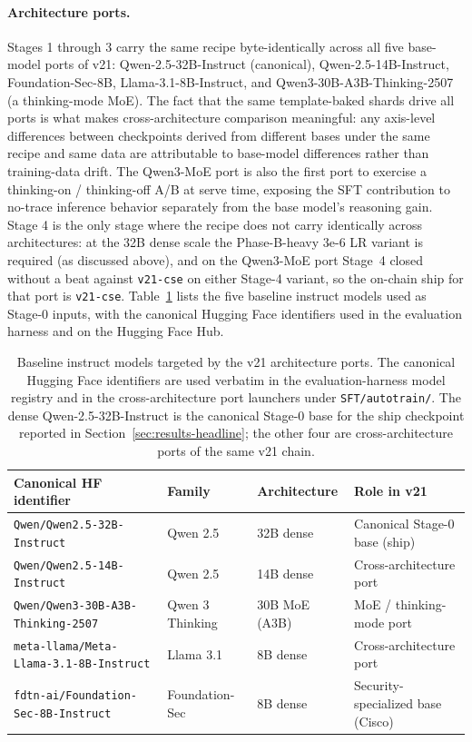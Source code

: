 \documentclass[conference]{IEEEtran}
\providecommand{\hfid}[1]{{\small\nolinkurl{#1}}}
\begin{document}
\paragraph{Architecture ports.}
Stages 1 through 3 carry the same recipe byte-identically across all five base-model ports of v21: Qwen-2.5-32B-Instruct (canonical), Qwen-2.5-14B-Instruct, Foundation-Sec-8B, Llama-3.1-8B-Instruct, and Qwen3-30B-A3B-Thinking-2507 (a thinking-mode MoE). The fact that the same template-baked shards drive all ports is what makes cross-architecture comparison meaningful: any axis-level differences between checkpoints derived from different bases under the same recipe and same data are attributable to base-model differences rather than training-data drift. The Qwen3-MoE port is also the first port to exercise a thinking-on / thinking-off A/B at serve time, exposing the SFT contribution to no-trace inference behavior separately from the base model's reasoning gain. Stage 4 is the only stage where the recipe does not carry identically across architectures: at the 32B dense scale the Phase-B-heavy 3e-6 LR variant is required (as discussed above), and on the Qwen3-MoE port Stage~4 closed without a beat against \hfid{v21-cse} on either Stage-4 variant, so the on-chain ship for that port is \hfid{v21-cse}. Table~\ref{tab:base-models} lists the five baseline instruct models used as Stage-0 inputs, with the canonical Hugging Face identifiers used in the evaluation harness and on the Hugging Face Hub.

\begin{table}[t]
\centering
\caption{Baseline instruct models targeted by the v21 architecture ports. The canonical Hugging Face identifiers are used verbatim in the evaluation-harness model registry and in the cross-architecture port launchers under \texorpdfstring{\hfid{SFT/autotrain/}}{SFT/autotrain/}. The dense Qwen-2.5-32B-Instruct is the canonical Stage-0 base for the ship checkpoint reported in Section~\ref{sec:results-headline}; the other four are cross-architecture ports of the same v21 chain.}
\label{tab:base-models}
\small
\setlength{\tabcolsep}{4pt}
\begin{tabular}{p{4.8cm} l l l}
\hline
\textbf{Canonical HF identifier} & \textbf{Family} & \textbf{Architecture} & \textbf{Role in v21} \\
\hline
\hfid{Qwen/Qwen2.5-32B-Instruct}             & Qwen 2.5             & 32B dense          & Canonical Stage-0 base (ship) \\
\hfid{Qwen/Qwen2.5-14B-Instruct}             & Qwen 2.5             & 14B dense          & Cross-architecture port \\
\hfid{Qwen/Qwen3-30B-A3B-Thinking-2507}      & Qwen 3 Thinking      & 30B MoE (A3B)      & MoE / thinking-mode port \\
\hfid{meta-llama/Meta-Llama-3.1-8B-Instruct} & Llama 3.1            & 8B dense           & Cross-architecture port \\
\hfid{fdtn-ai/Foundation-Sec-8B-Instruct}    & Foundation-Sec       & 8B dense           & Security-specialized base (Cisco) \\
\hline
\end{tabular}
\end{table}
\end{document}
